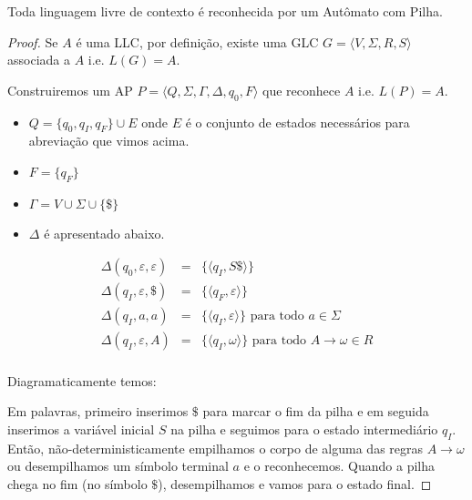 \begin{theorem}
  Toda linguagem livre de contexto é reconhecida por um Autômato com Pilha.
\end{theorem}
\begin{proof}
  Se $A$ é uma LLC, por definição, existe uma GLC $G = \langle V, \Sigma, R, S \rangle$ associada a $A$ i.e. $L(G) = A$.

  Construiremos um AP $P = \langle Q, \Sigma, \Gamma, \Delta, q_0, F \rangle$ que reconhece $A$ i.e. $L(P) = A$.

  \begin{itemize}
  \item $Q = \{q_0, q_I, q_F\} \cup E$ onde $E$ é o conjunto de estados necessários para abreviação que vimos acima.
  \item $F = \{q_F\}$
  \item $\Gamma = V \cup \Sigma \cup \{\$\}$
  \item $\Delta$ é apresentado abaixo.
  \end{itemize}


  \begin{eqnarray*}
    \Delta(q_0, \varepsilon, \varepsilon) & = & \{\langle q_I, S\$ \rangle\}\\
    \Delta(q_I, \varepsilon, \$) & = & \{\langle q_F, \varepsilon \rangle\}\\
    \Delta(q_I, a, a) & = & \{\langle q_I, \varepsilon \rangle\} \textrm{ para todo } a \in \Sigma\\
    \Delta(q_I, \varepsilon, A) & = & \{\langle q_I, \omega \rangle\} \textrm{ para todo } A \to \omega \in R\\
  \end{eqnarray*}

  Diagramaticamente temos:

  \begin{center}
  \end{center}

Em palavras, primeiro inserimos $\$$ para marcar o fim da pilha e em seguida inserimos a variável inicial $S$ na pilha e seguimos para o estado intermediário $q_I$.
Então, não-deterministicamente empilhamos o corpo de alguma das regras $A \to \omega$ ou desempilhamos um símbolo terminal $a$ e o reconhecemos.
Quando a pilha chega no fim (no símbolo $\$$), desempilhamos e vamos para o estado final.
\end{proof}


